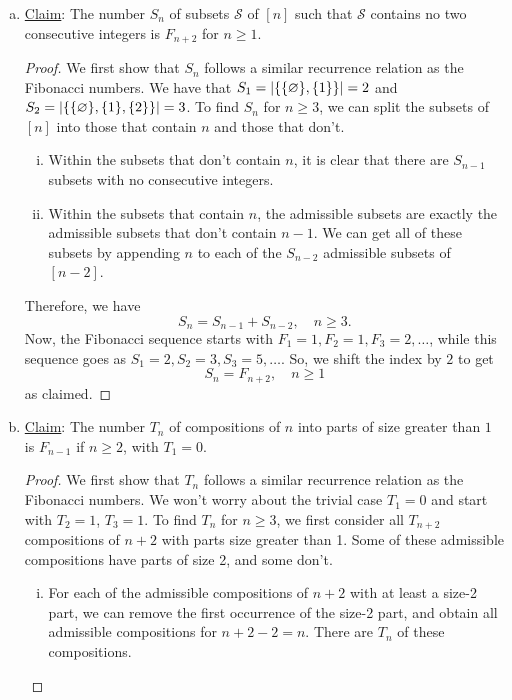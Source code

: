 \documentclass[11pt]{article}
\begin{document}
\begin{enumerate}[(a)]
	\item \underline{Claim}: The number $S_n$ of subsets $\mathcal{S}$ of $[n]$ such that $\mathcal{S}$ contains no two consecutive integers is $\boxed{{F_{n+2}}}$ for $n\geq 1$.
	
	
	\begin{proof}
		We first show that $S_n$ follows a similar recurrence relation as the Fibonacci numbers. We have that $S_1 = \abs{\{ \{\varnothing\}, \{1\}   \}}  = 2$ and $S_2 = \abs{\{ \{\varnothing\}, \{1\} , \{2\}  \}} = 3$. To find $S_{n}$ for $n\geq 3$, we can split the subsets of $[n]$ into those that contain $n$ and those that don't. 
		\begin{enumerate}[(i)]
			\item Within the subsets that don't contain $n$, it is clear that there are $S_{n-1}$ subsets with no consecutive integers.
			
			
			\item Within the subsets that contain $n$, the admissible subsets are exactly the admissible subsets that don't contain $n-1$. We can get all of these subsets by appending $n$ to each of the $S_{n-2}$ admissible subsets of $[n-2]$.
		\end{enumerate}
		
		Therefore, we have
		\begin{equation*}
		S_{n} = S_{n-1} + S_{n-2}, \quad n \geq 3.
		\end{equation*}
		Now, the Fibonacci sequence starts with $F_1 = 1, F_2 = 1, F_3 = 2,\dots$, while this sequence goes as $S_1 = 2, S_2 = 3, S_3 = 5, \dots$. So, we shift the index by $2$ to get
		\begin{equation*}
		S_n = F_{n+2},\quad n\geq 1
		\end{equation*}
		as claimed. 
	\end{proof} 
	
	
	
	
	
	
	\item \underline{Claim}: The number $T_n$ of compositions of $n$ into parts of size greater than $1$ is $\boxed{F_{n-1}}$ if $n\geq 2$, with $T_1 = 0$.
	
	
	\begin{proof}
		We first show that $T_n$ follows a similar recurrence relation as the Fibonacci numbers. We won't worry about the trivial case $T_1 = 0$ and start with $T_2 = 1$, $T_3 = 1$. To find $T_n$ for $n\geq 3$, we first consider all $T_{n+2}$ compositions of $n+2$ with parts size greater than 1. Some of these admissible compositions have parts of size 2, and some don't. 
		\begin{enumerate}[(i)]
			\item For each of the admissible compositions of $n+2$ with at least a size-2 part, we can remove the first occurrence of the size-2 part, and obtain all  admissible compositions for $n+2-2 = n$. There are $T_n$ of these compositions.
			

\end{enumerate}
\end{proof}
\end{enumerate}
\end{document}
